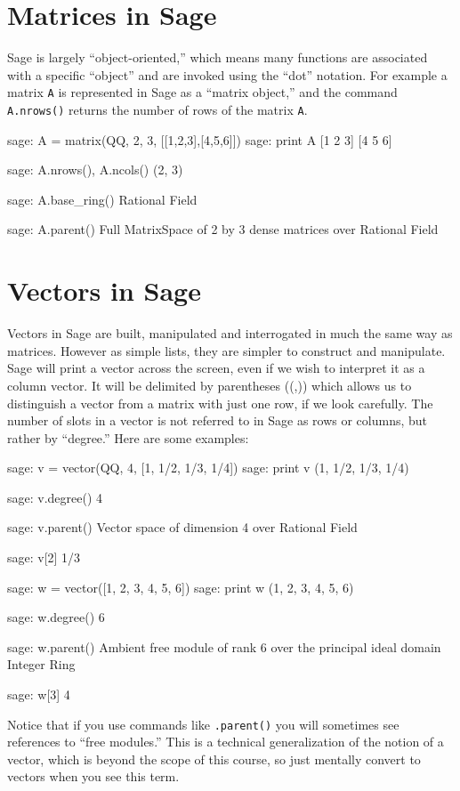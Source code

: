 \documentclass[fleqn,11pt]{paper}
\theoremstyle{remark}
\newcommand{\<}{\ensuremath{\langle}}
\renewcommand{\>}{\ensuremath{\rangle}}
\begin{document}
\section{Matrices in Sage}
\label{sec:matrices-sage}
Sage is largely ``object-oriented,'' which means many functions are associated
with a specific ``object'' and are invoked using the ``dot'' notation. For
example a matrix {\tt A} is represented in Sage as a ``matrix object,'' and
the command {\tt A.nrows()} returns the number of rows of the matrix {\tt A}.
\begin{sageblock}
    sage: A = matrix(QQ, 2, 3, [[1,2,3],[4,5,6]])
    sage: print A
      [1 2 3]
      [4 5 6]

    sage: A.nrows(), A.ncols()
      (2, 3)

    sage: A.base_ring()
      Rational Field

    sage: A.parent()
      Full MatrixSpace of 2 by 3 dense matrices over Rational Field
\end{sageblock}

\section{Vectors in Sage}
\label{sec:vectors-sage}
Vectors in Sage are built, manipulated and interrogated in much the same way
as matrices. However as simple lists, they are simpler to construct
and manipulate. Sage will print a vector across the screen, even if we wish to
interpret it as a column vector. It will be delimited by parentheses ((,)) which allows
us to distinguish a vector from a matrix with just one row, if we look carefully. The
number of slots in a vector is not referred to in Sage as rows or columns, but rather
by ``degree.'' Here are some examples:

\begin{sageblock}
    sage: v = vector(QQ, 4, [1, 1/2, 1/3, 1/4])
    sage: print v
      (1, 1/2, 1/3, 1/4)

    sage: v.degree()
      4
  
    sage: v.parent()
      Vector space of dimension 4 over Rational Field

    sage: v[2]
      1/3

    sage: w = vector([1, 2, 3, 4, 5, 6])
    sage: print w
      (1, 2, 3, 4, 5, 6)

    sage: w.degree()
      6

    sage: w.parent()
      Ambient free module of rank 6 over the principal ideal domain Integer Ring

    sage: w[3]
      4
\end{sageblock}
Notice that if you use commands like {\tt .parent()} you will sometimes see references
to ``free modules.'' This is a technical generalization of the notion of a vector, which
is beyond the scope of this course, so just mentally convert to vectors when you see
this term.
\end{document}
